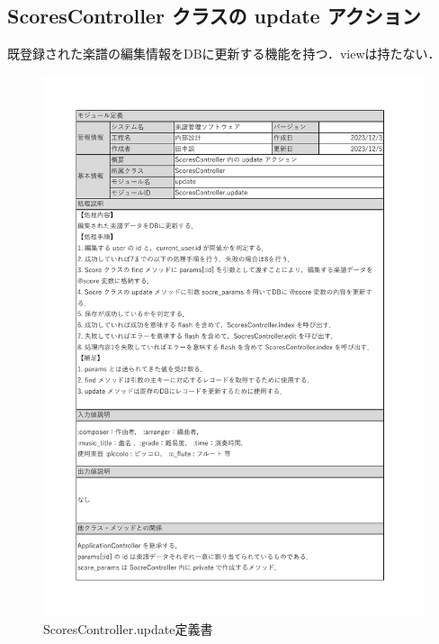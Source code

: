 \subsection*{ScoresController クラスの update アクション}
既登録された楽譜の編集情報をDBに更新する機能を持つ．viewは持たない．
\begin{figure}[H]
    \centering
    \includegraphics[scale=0.6]{img/Scores/xlsx/ScoresController_update.pdf}
    \vspace{-1cm}
    \caption{ScoresController.update定義書}
\end{figure}

